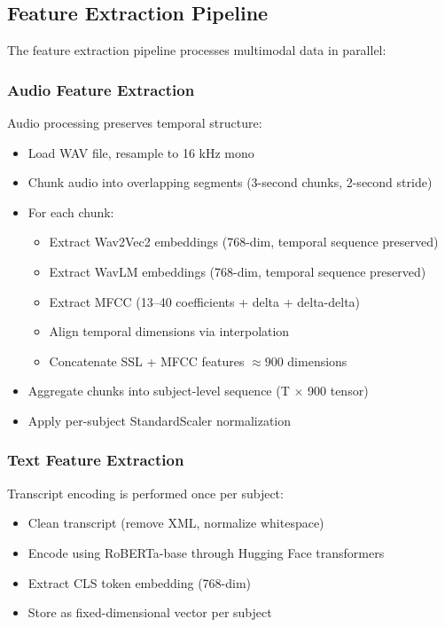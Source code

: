 \documentclass[12pt]{article}
\begin{document}
	\subsection{Feature Extraction Pipeline}

	The feature extraction pipeline processes multimodal data in parallel:

	\subsubsection{Audio Feature Extraction}

	Audio processing preserves temporal structure:

	\begin{itemize}
		\item Load WAV file, resample to 16 kHz mono
		\item Chunk audio into overlapping segments (3-second chunks, 2-second stride)
		\item For each chunk:
		\begin{itemize}
			\item Extract Wav2Vec2 embeddings (768-dim, temporal sequence preserved)
			\item Extract WavLM embeddings (768-dim, temporal sequence preserved)
			\item Extract MFCC (13--40 coefficients + delta + delta-delta)
			\item Align temporal dimensions via interpolation
			\item Concatenate SSL + MFCC features $\approx 900$ dimensions
		\end{itemize}
		\item Aggregate chunks into subject-level sequence (T $\times$ 900 tensor)
		\item Apply per-subject StandardScaler normalization
	\end{itemize}

	\subsubsection{Text Feature Extraction}

	Transcript encoding is performed once per subject:

	\begin{itemize}
		\item Clean transcript (remove XML, normalize whitespace)
		\item Encode using RoBERTa-base through Hugging Face transformers
		\item Extract CLS token embedding (768-dim)
		\item Store as fixed-dimensional vector per subject
	\end{itemize}
\end{document}

